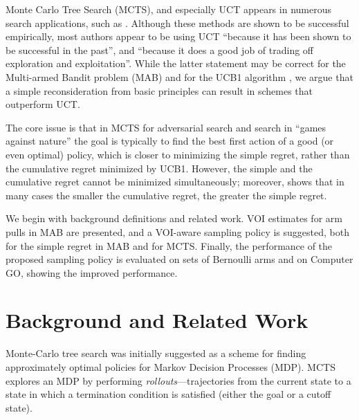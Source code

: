
Monte Carlo Tree Search (MCTS), and especially UCT \cite{Kocsis.uct}
appears in numerous search applications, such
as \cite{Eyerich.ctp}. Although these methods are shown to be
successful empirically, most authors appear to be using UCT ``because
it has been shown to be successful in the past'', and ``because it
does a good job of trading off exploration and exploitation''. While
the latter statement may be correct for the Multi-armed Bandit problem (MAB)
and for the UCB1 algorithm \cite{Auer.ucb}, we argue that a simple
reconsideration from basic principles can result in schemes that
outperform UCT.

The core issue is that in MCTS for adversarial search and search in
``games against nature'' the goal is typically to find the best
first action of a good (or even optimal) policy, which is closer to
minimizing the simple regret, rather than the cumulative regret
minimized by UCB1.  However, the simple and the cumulative regret
cannot be minimized simultaneously; moreover, \cite{Bubeck.pure} shows
that in many cases the smaller the cumulative regret, the greater the
simple regret.

We begin with background definitions and related work.  VOI estimates
for arm pulls in MAB are presented, and a VOI-aware sampling policy is
suggested, both for the simple regret in MAB and for MCTS.  Finally,
the performance of the proposed sampling policy is evaluated on sets
of Bernoulli arms and on Computer GO, showing the improved
performance.

\section{Background and Related Work}
\label{sec:mcts-related-work}

Monte-Carlo tree search was initially suggested as a scheme for
finding approximately optimal policies for Markov Decision Processes
(MDP).  MCTS explores an MDP by performing
\emph{rollouts}---trajectories from the current state to a state in
which a termination condition is satisfied (either the goal or a
cutoff state).

